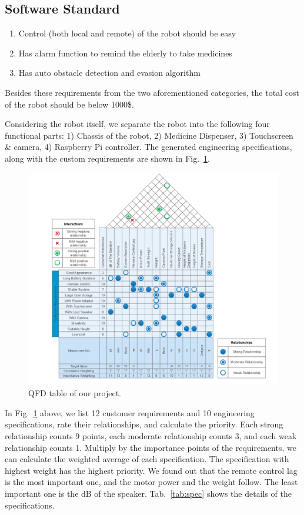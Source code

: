 \documentclass[12pt]{article}
\begin{document}
\subsection{Software Standard}
\begin{enumerate}
	\item Control (both local and remote) of the robot should be easy 
	\item Has alarm function to remind the elderly to take medicines
	\item Has auto obstacle detection and evasion algorithm 
\end{enumerate}

Besides these requirements from the two aforementioned categories, the total cost of the robot should be below 1000\$.

Considering the robot itself, we separate the robot into the following four functional parts: 1) Chassis of the robot, 2) Medicine Dispenser, 3) Touchscreen \& camera, 4) Raspberry Pi controller. The generated engineering specifications, along with the custom requirements are shown in Fig.~\ref{fig::qfd}.

\begin{figure}[H]
	
	\centering
	\includegraphics[width=7in]{qfd}
	\caption{QFD table of our project.}
	\label{fig::qfd}

\end{figure}
   In Fig.~\ref{fig::qfd} above, we list 12 customer requirements and 10 engineering specifications, rate their relationships, and calculate the priority. Each strong relationship counts 9 points, each moderate relationship counts 3, and each weak relationship counts 1. Multiply by the importance points of the requirements, we can calculate the weighted average of each specification. The specification with highest weight has the highest priority. We found out that the remote control lag is the most important one, and the motor power and the weight follow. The least important one is the dB of the speaker. Tab.~\ref{tab:spec} shows the details of the specifications.
   
\end{document}
